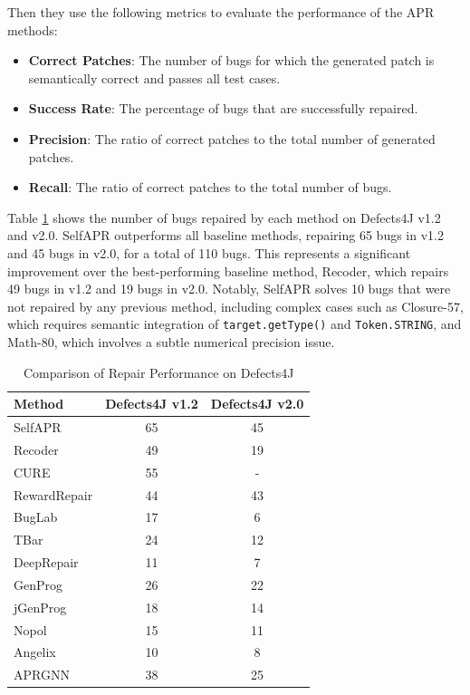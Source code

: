 \documentclass[manuscript,screen,review]{acmart}
\begin{document}
Then they use the following metrics to evaluate the performance of the APR methods:
\begin{itemize}
\item \textbf{Correct Patches}: The number of bugs for which the generated patch is semantically correct and passes all test cases.
\item \textbf{Success Rate}: The percentage of bugs that are successfully repaired.
\item \textbf{Precision}: The ratio of correct patches to the total number of generated patches.
\item \textbf{Recall}: The ratio of correct patches to the total number of bugs.
\end{itemize}

Table \ref{tab:comparison} shows the number of bugs repaired by each method on Defects4J v1.2 and v2.0. SelfAPR outperforms all baseline methods, repairing 65 bugs in v1.2 and 45 bugs in v2.0, for a total of 110 bugs. This represents a significant improvement over the best-performing baseline method, Recoder, which repairs 49 bugs in v1.2 and 19 bugs in v2.0. Notably, SelfAPR solves 10 bugs that were not repaired by any previous method, including complex cases such as Closure-57, which requires semantic integration of \texttt{target.getType()} and \texttt{Token.STRING}, and Math-80, which involves a subtle numerical precision issue.

\begin{table}[h]
\centering
\caption{Comparison of Repair Performance on Defects4J}
\label{tab:comparison}
\begin{tabular}{lcc}
\toprule
Method & Defects4J v1.2 & Defects4J v2.0 \\
\midrule
SelfAPR & 65 & 45 \\
Recoder & 49 & 19 \\
CURE & 55 & - \\
RewardRepair & 44 & 43 \\
BugLab & 17 & 6 \\
TBar & 24 & 12 \\
DeepRepair & 11 & 7 \\
GenProg & 26 & 22 \\
jGenProg & 18 & 14 \\
Nopol & 15 & 11 \\
Angelix & 10 & 8 \\
APRGNN & 38 & 25 \\
\bottomrule
\end{tabular}
\end{table}
\end{document}

